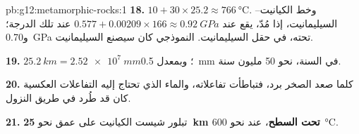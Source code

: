 \begin{solution}{pb:g12:metamorphic-rocks:1}
\textbf{18.} $10 + 30 \times 25.2 \approx \qty{766}{\celsius}$. وخط
الكيانيت--السيليمانيت، إذا مُدّ، يقع عند $0.577 + 0.00209 \times 166
\approx \qty{0.92}{GPa}$ عند تلك الدرجة؛ و\qty{0.70}{GPa} تحته،
في حقل السيليمانيت.  النموذجي كان سيصنع السيليمانيت.

\textbf{19.} $\qty{25.2}{km} = \qty{2.52e7}{mm}$؛ وبمعدل \qty{0.5}{mm} في السنة،
نحو 50 مليون سنة.

\textbf{20.} كلما صعد الصخر برد، فتباطأت تفاعلاته،
والماء الذي تحتاج إليه التفاعلات العكسية كان قد طُرد في طريق
النزول.

\textbf{21.} تبلور شيست الكيانيت على عمق نحو \textbf{\qty{25}{km}
تحت السطح}، عند نحو \qty{600}{\celsius}.
\end{solution}
